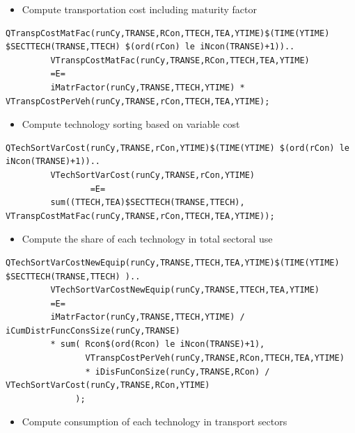 \documentclass[a4paper,]{scrartcl}
\providecommand{\tightlist}{%
  \setlength{\itemsep}{0pt}\setlength{\parskip}{0pt}}
\begin{document}
\begin{itemize}
\tightlist
\item
  Compute transportation cost including maturity factor
\end{itemize}

\begin{lstlisting}
QTranspCostMatFac(runCy,TRANSE,RCon,TTECH,TEA,YTIME)$(TIME(YTIME) $SECTTECH(TRANSE,TTECH) $(ord(rCon) le iNcon(TRANSE)+1))..
         VTranspCostMatFac(runCy,TRANSE,RCon,TTECH,TEA,YTIME) 
         =E=
         iMatrFactor(runCy,TRANSE,TTECH,YTIME) * VTranspCostPerVeh(runCy,TRANSE,rCon,TTECH,TEA,YTIME);
\end{lstlisting}

\begin{itemize}
\tightlist
\item
  Compute technology sorting based on variable cost
\end{itemize}

\begin{lstlisting}
QTechSortVarCost(runCy,TRANSE,rCon,YTIME)$(TIME(YTIME) $(ord(rCon) le iNcon(TRANSE)+1))..
         VTechSortVarCost(runCy,TRANSE,rCon,YTIME)
                 =E=
         sum((TTECH,TEA)$SECTTECH(TRANSE,TTECH), VTranspCostMatFac(runCy,TRANSE,rCon,TTECH,TEA,YTIME));
\end{lstlisting}

\begin{itemize}
\tightlist
\item
  Compute the share of each technology in total sectoral use
\end{itemize}

\begin{lstlisting}
QTechSortVarCostNewEquip(runCy,TRANSE,TTECH,TEA,YTIME)$(TIME(YTIME) $SECTTECH(TRANSE,TTECH) )..
         VTechSortVarCostNewEquip(runCy,TRANSE,TTECH,TEA,YTIME)
         =E=
         iMatrFactor(runCy,TRANSE,TTECH,YTIME) / iCumDistrFuncConsSize(runCy,TRANSE)
         * sum( Rcon$(ord(Rcon) le iNcon(TRANSE)+1),
                VTranspCostPerVeh(runCy,TRANSE,RCon,TTECH,TEA,YTIME)
                * iDisFunConSize(runCy,TRANSE,RCon) / VTechSortVarCost(runCy,TRANSE,RCon,YTIME)
              );
\end{lstlisting}

\begin{itemize}
\tightlist
\item
  Compute consumption of each technology in transport sectors
\end{itemize}
\end{document}
